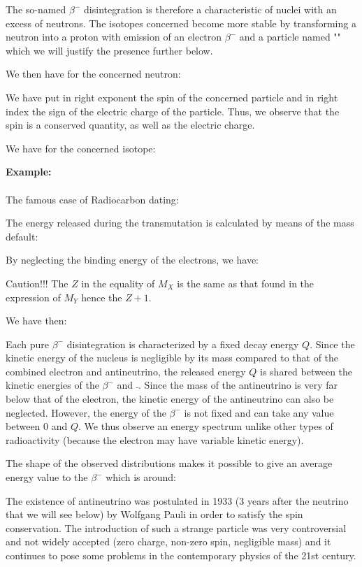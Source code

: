 	The so-named $\beta^{-}$ disintegration is therefore a characteristic of nuclei with an excess of neutrons. The isotopes concerned become more stable by transforming a neutron into a proton with emission of an electron $\beta^{-}$ and a particle named "" which we will justify the presence further below.

	We then have for the concerned neutron:
	
	We have put in right exponent the spin of the concerned  particle and in right index the sign of the electric charge of the particle. Thus, we observe that the spin is a conserved quantity, as well as the electric charge.

	We have for the concerned isotope:
	
	\begin{tcolorbox}[colframe=black,colback=white,sharp corners]
	\textbf{{\Large {}}Example:}\\\\
	The famous case of Radiocarbon dating:
	
	\end{tcolorbox}
	The energy released during the transmutation is calculated by means of the mass default:
	
	By neglecting the binding energy of the electrons, we have:
	
	Caution!!! The $Z$ in the equality of $M_X$ is the same as that found in the expression of $M_Y$ hence the $Z + 1$.

	We have then:
	
	Each pure $\beta^{-}$ disintegration is characterized by a fixed decay energy $Q$. Since the kinetic energy of the nucleus is negligible by its mass compared to that of the combined electron and antineutrino, the released energy $Q$ is shared between the kinetic energies of the $\beta^{-}$ and $\bar{}$. Since the mass of the antineutrino is very far below that of the electron, the kinetic energy of the antineutrino can also be neglected. However, the energy of the $\beta^{-}$ is not fixed and can take any value between $0$ and $Q$. We thus observe an energy spectrum unlike other types of radioactivity (because the electron may have variable kinetic energy).

	The shape of the observed distributions makes it possible to give an average energy value to the $\beta^{-}$ which is around:
	
	The existence of antineutrino was postulated in 1933 ($3$ years after the neutrino that we will see below) by Wolfgang Pauli in order to satisfy the spin conservation. The introduction of such a strange particle was very controversial and not widely accepted (zero charge, non-zero spin, negligible mass) and it continues to pose some problems in the contemporary physics of the 21st century.

